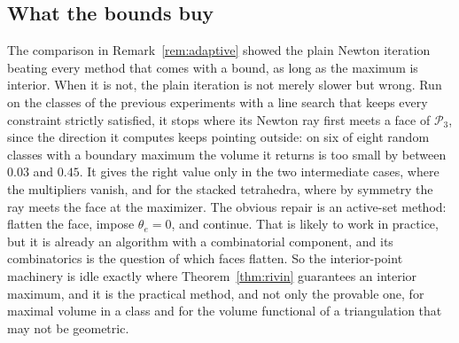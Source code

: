 \documentclass[11pt]{amsart}
\theoremstyle{definition}
\theoremstyle{remark}
\begin{document}
\subsection{What the bounds buy}\label{sec:buy}
The comparison in Remark~\ref{rem:adaptive} showed the plain Newton iteration beating every method that comes with a bound, as long as the maximum is interior. When it is not, the plain iteration is not merely slower but wrong.
Run on the classes of the previous experiments with a line search that keeps every constraint strictly satisfied, it stops where its Newton ray first meets a face of $\mathcal P_3$, since the direction it computes keeps pointing outside: on six of eight random classes with a boundary maximum the volume it returns is too small by between $0.03$ and $0.45$.
It gives the right value only in the two intermediate cases, where the multipliers vanish, and for the stacked tetrahedra, where by symmetry the ray meets the face at the maximizer.
The obvious repair is an active-set method: flatten the face, impose $\theta_e=0$, and continue. That is likely to work in practice, but it is already an algorithm with a combinatorial component, and its combinatorics is the question of which faces flatten.
So the interior-point machinery is idle exactly where Theorem~\ref{thm:rivin} guarantees an interior maximum, and it is the practical method, and not only the provable one, for maximal volume in a class and for the volume functional of a triangulation that may not be geometric.
\end{document}

